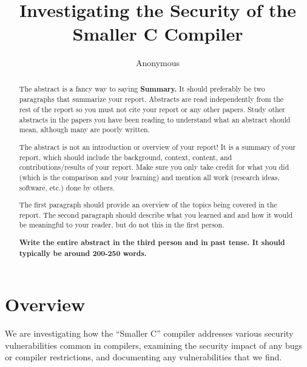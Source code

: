 \documentclass[sigconf, anonymous]{acmart}
\begin{document}
\title{Investigating the Security of the Smaller C Compiler}

\author{Anonymous}

\begin{abstract}
  The abstract is a fancy way to saying {\bf Summary.} It should
  preferably be two paragraphs that summarize your report. Abstracts
  are read independently from the rest of the report so you must not
  cite your report or any other papers. Study other abstracts in the
  papers you have been reading to understand what an abstract should
  mean, although many are poorly written.

  The abstract is not an introduction or overview of your report! It is
  a summary of your report, which should include the background,
  context, content, and contributions/results of your report. Make
  sure you only take credit for what you did (which is the comparison
  and your learning) and mention all work (research ideas, software,
  etc.) done by others.

  The first paragraph should provide an overview of the topics being
  covered in the report. The second paragraph should describe what you
  learned and and how it would be meaningful to your reader, but do
  not this in the first person.
  
  {\bf Write the entire abstract in the third person and in past
    tense. It should typically be around 200-250 words.}
\end{abstract}


\maketitle


\section{Overview}
\label{motivation}

We are investigating how the “Smaller C” compiler addresses various security vulnerabilities common in compilers, examining the security impact of any bugs or compiler restrictions, and documenting any vulnerabilities that we find.
	
\end{document}
